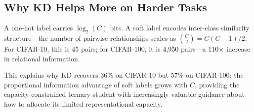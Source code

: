 \documentclass[10pt]{article}
\begin{document}
\subsection{Why KD Helps More on Harder Tasks}

A one-hot label carries $\log_2(C)$ bits. A soft label encodes inter-class similarity structure---the number of pairwise relationships scales as $\binom{C}{2} = C(C-1)/2$. For CIFAR-10, this is 45 pairs; for CIFAR-100, it is 4,950 pairs---a 110$\times$ increase in relational information.

This explains why KD recovers 36\% on CIFAR-10 but 57\% on CIFAR-100: the proportional information advantage of soft labels grows with $C$, providing the capacity-constrained ternary student with increasingly valuable guidance about how to allocate its limited representational capacity.
\end{document}
